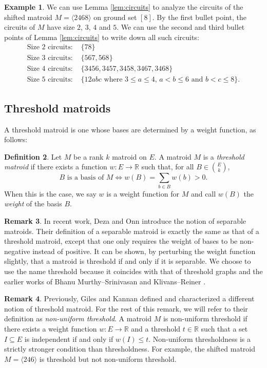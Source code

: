 \documentclass{amsart}
\theoremstyle{definition}
\newtheorem{defn}{Definition}[section]
\newtheorem{remark}[defn]{Remark}
\newtheorem{example}[defn]{Example}
\theoremstyle{plain}
\newcommand{\R}{\mathbb{R}}
\begin{document}
\begin{example}
  We can use Lemma \ref{lem:circuits} to analyze the circuits of the shifted matroid $M=\langle 2468\rangle$ on ground set $[8]$. By the first bullet point, the circuits of $M$ have size $2$, $3$, $4$ and $5$. We can use the second and third bullet points of Lemma \ref{lem:circuits} to write down all such circuits:
  \begin{align*}
    \text{Size $2$ circuits: }& \{78\}\\
    \text{Size $3$ circuits: }& \{567, 568\}\\
    \text{Size $4$ circuits: }& \{3456,3457,3458,3467,3468\}\\
    \text{Size $5$ circuits: }& \{12abc \text{ where $3\leq a \leq 4$, $a< b \leq 6$ and $b< c \leq 8$}\}.
  \end{align*}
\end{example}

\subsection{Threshold matroids}
A threshold matroid is one whose bases are determined by a weight function, as follows:
\begin{defn}\label{def:thresh}
Let $M$ be a rank $k$ matroid on $E$. A matroid $M$ is a \emph{threshold matroid} if there exists a function $w:E\to \R$ such that, for all $B\in \binom{E}{k}$,
\[\text{$B$ is a basis of $M$} \iff w(B)=\sum_{b\in B} w(b) > 0.\]
When this is the case, we say $w$ is a weight function for $M$ and call $w(B)$ the \emph{weight} of the basis $B$.
\end{defn}
\begin{remark}\label{rem:thresh}
In recent work, Deza and Onn \cite{DO} introduce the notion of separable matroids. Their definition of a separable matroid is exactly the same as that of a threshold matroid, except that one only requires the weight of bases to be non-negative instead of positive. It can be shown, by perturbing the weight function slightly, that a matroid is threshold if and only if it is separable. We choose to use the name threshold because it coincides with that of threshold graphs and the earlier works of Bhanu Murthy--Srinivasan \cite{BS} and Klivans--Reiner \cite{KR}.
\end{remark}

\begin{remark}
  \label{rem:GK}
Previously, Giles and Kannan \cite{GK} defined and characterized a different notion of threshold matroid. For the rest of this remark, we will refer to their definition as \emph{non-uniform threshold}. A matroid $M$ is non-uniform threshold if there exists a weight function $w:E\to \R$ and a threshold $t\in \R$ such that a set $I\subseteq E$ is independent if and only if $w(I)\leq t$. Non-uniform thresholdness is a strictly stronger condition than thresholdness. For example, the shifted matroid $M= \langle 246 \rangle$ is threshold but not non-uniform threshold.  
\end{remark}
\end{document}
